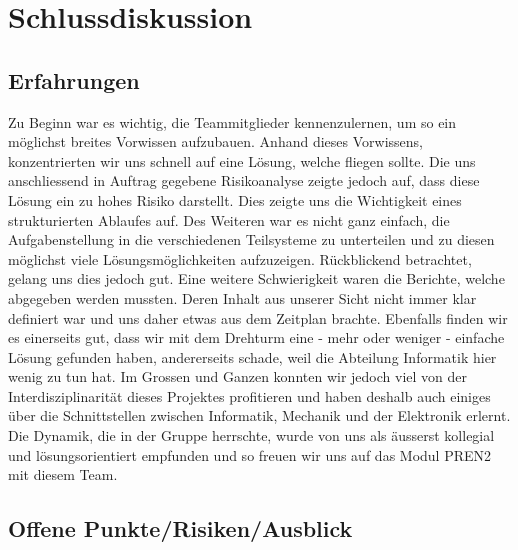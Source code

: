 \section{Schlussdiskussion}

\subsection{Erfahrungen}

Zu Beginn war es wichtig, die Teammitglieder kennenzulernen, um so ein 
möglichst breites Vorwissen aufzubauen. Anhand dieses Vorwissens, 
konzentrierten wir uns schnell auf eine Lösung, welche fliegen sollte. Die uns 
anschliessend in Auftrag gegebene Risikoanalyse zeigte jedoch auf, dass diese 
Lösung ein zu hohes Risiko darstellt. Dies zeigte uns die 
Wichtigkeit eines strukturierten Ablaufes auf. Des Weiteren war es nicht ganz  
einfach, die Aufgabenstellung in die verschiedenen Teilsysteme zu unterteilen  
und zu diesen möglichst viele Lösungsmöglichkeiten aufzuzeigen. 
Rückblickend betrachtet, gelang uns dies jedoch gut. Eine weitere 
Schwierigkeit waren die Berichte, welche abgegeben werden mussten. 
Deren Inhalt aus unserer Sicht nicht immer klar definiert war und uns daher 
etwas aus dem Zeitplan brachte.
Ebenfalls finden wir es einerseits gut, dass wir mit dem Drehturm eine - mehr oder weniger - einfache Lösung gefunden haben, andererseits schade, weil die Abteilung Informatik hier wenig zu tun hat. Im Grossen und Ganzen konnten wir jedoch viel 
von der Interdisziplinarität dieses Projektes profitieren und haben deshalb 
auch einiges über die Schnittstellen zwischen Informatik, Mechanik und der Elektronik 
erlernt. Die Dynamik, die in der Gruppe herrschte, wurde von uns als äusserst kollegial und lösungsorientiert empfunden und so freuen wir uns auf das Modul PREN2 mit diesem Team.


\subsection{Offene Punkte/Risiken/Ausblick}

